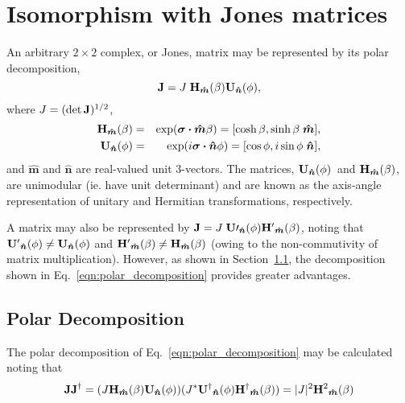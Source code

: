 \documentclass[12pt]{article}
\newcommand{\boost}[1][]{{\ensuremath{ {\bf H}{#1}_{\bm{\hat m}}(\beta) }}}
\newcommand{\rotat}[1][]{{\ensuremath{ {\bf U}{#1}_{\bm{\hat n}}(\phi) }}}
\begin{document}
\section{Isomorphism with Jones matrices}

An arbitrary $2\times2$ complex, or Jones, matrix may be represented
by its polar decomposition,
\begin{equation}
{\bf J} = J \; \boost \rotat,
\label{eqn:polar_decomposition}
\end{equation}
where $J=(\det{\bf J})^{1/2}$,
\begin{eqnarray}
\boost &=& \exp(\bm{\sigma\cdot}\bm{\hat m}\beta)
        = [\cosh\beta,\sinh\beta\;\bm{\hat m}],
\label{eqn:boost} \\
\rotat &=& \exp(i\bm{\sigma\cdot}\bm{\hat n}\phi)
        = [\cos\phi,i\sin\phi\;\bm{\hat n}],
\label{eqn:rotation}
\end{eqnarray}
and $\bm{\hat m}$ and $\bm{\hat n}$ are real-valued unit 3-vectors.
The matrices, \rotat\ and \boost, are unimodular (ie. have unit
determinant) and are known as the axis-angle representation of unitary
and Hermitian transformations, respectively.

A matrix may also be represented by ${\bf J} = J \; \rotat[\prime]
\boost[^\prime]$, noting that $\rotat[^\prime]\ne\rotat$ and
$\boost[^\prime]\ne\boost$ (owing to the non-commutivity of matrix
multiplication).  However, as shown in
Section~\ref{sec:polar_decomposition}, the decomposition shown in
Eq.~\ref{eqn:polar_decomposition} provides greater advantages.

\subsection{Polar Decomposition}
\label{sec:polar_decomposition}

The polar decomposition of Eq.~\ref{eqn:polar_decomposition} may be 
calculated noting that
\begin{equation}
{\bf JJ}^\dagger = (J\boost\rotat)(J^*\rotat[^\dagger]\boost[^\dagger])
	= |J|^2 \boost[^2]
\end{equation}
\end{document}
